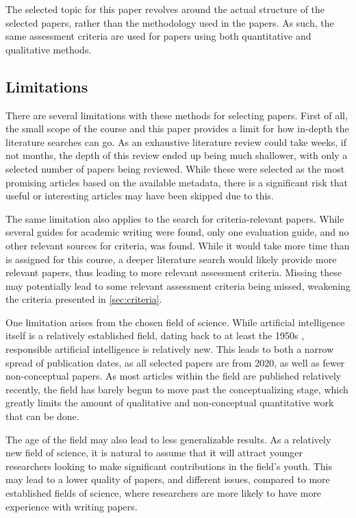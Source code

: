 The selected topic for this paper revolves around the actual structure of the selected papers, rather than the methodology used in the papers. As such, the same assessment criteria are used for papers using both quantitative and qualitative methods.

\subsection{Limitations}
There are several limitations with these methods for selecting papers. First of all, the small scope of the course and this paper provides a limit for how in-depth the literature searches can go. As an exhaustive literature review could take weeks, if not months, the depth of this review ended up being much shallower, with only a selected number of papers being reviewed. While these were selected as the most promising articles based on the available metadata, there is a significant risk that useful or interesting articles may have been skipped due to this.

The same limitation also applies to the search for criteria-relevant papers. While several guides for academic writing were found, only one evaluation guide, and no other relevant sources for criteria, was found. While it would take more time than is assigned for this course, a deeper literature search would likely provide more relevant papers, thus leading to more relevant assessment criteria. Missing these may potentially lead to some relevant assessment criteria being missed, weakening the criteria presented in \autoref{sec:criteria}.

One limitation arises from the chosen field of science. While artificial intelligence itself is a relatively established field, dating back to at least the 1950s \parencite{Moor_2006}, responsible artificial intelligence is relatively new. This leads to both a narrow spread of publication dates, as all selected papers are from 2020, as well as fewer non-conceptual papers. As most articles within the field are published relatively recently, the field has barely begun to move past the conceptualizing stage, which greatly limits the amount of qualitative and non-conceptual quantitative work that can be done.

The age of the field may also lead to less generalizable results. As a relatively new field of science, it is natural to assume that it will attract younger researchers looking to make significant contributions in the field's youth. This may lead to a lower quality of papers, and different issues, compared to more established fields of science, where researchers are more likely to have more experience with writing papers.